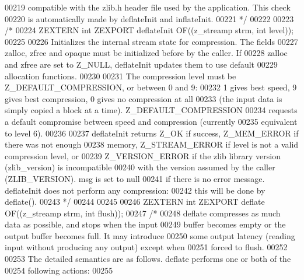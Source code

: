 \begin{DoxyCode}
00219 \textcolor{comment}{   compatible with the zlib.h header file used by the application.  This check}
00220 \textcolor{comment}{   is automatically made by deflateInit and inflateInit.}
00221 \textcolor{comment}{ */}
00222 
00223 \textcolor{comment}{/*}
00224 \textcolor{comment}{ZEXTERN int ZEXPORT deflateInit OF((z\_streamp strm, int level));}
00225 \textcolor{comment}{}
00226 \textcolor{comment}{     Initializes the internal stream state for compression.  The fields}
00227 \textcolor{comment}{   zalloc, zfree and opaque must be initialized before by the caller.  If}
00228 \textcolor{comment}{   zalloc and zfree are set to Z\_NULL, deflateInit updates them to use default}
00229 \textcolor{comment}{   allocation functions.}
00230 \textcolor{comment}{}
00231 \textcolor{comment}{     The compression level must be Z\_DEFAULT\_COMPRESSION, or between 0 and 9:}
00232 \textcolor{comment}{   1 gives best speed, 9 gives best compression, 0 gives no compression at all}
00233 \textcolor{comment}{   (the input data is simply copied a block at a time).  Z\_DEFAULT\_COMPRESSION}
00234 \textcolor{comment}{   requests a default compromise between speed and compression (currently}
00235 \textcolor{comment}{   equivalent to level 6).}
00236 \textcolor{comment}{}
00237 \textcolor{comment}{     deflateInit returns Z\_OK if success, Z\_MEM\_ERROR if there was not enough}
00238 \textcolor{comment}{   memory, Z\_STREAM\_ERROR if level is not a valid compression level, or}
00239 \textcolor{comment}{   Z\_VERSION\_ERROR if the zlib library version (zlib\_version) is incompatible}
00240 \textcolor{comment}{   with the version assumed by the caller (ZLIB\_VERSION).  msg is set to null}
00241 \textcolor{comment}{   if there is no error message.  deflateInit does not perform any compression:}
00242 \textcolor{comment}{   this will be done by deflate().}
00243 \textcolor{comment}{*/}
00244 
00245 
00246 ZEXTERN \textcolor{keywordtype}{int} ZEXPORT deflate OF((z\_streamp strm, \textcolor{keywordtype}{int} flush));
00247 \textcolor{comment}{/*}
00248 \textcolor{comment}{    deflate compresses as much data as possible, and stops when the input}
00249 \textcolor{comment}{  buffer becomes empty or the output buffer becomes full.  It may introduce}
00250 \textcolor{comment}{  some output latency (reading input without producing any output) except when}
00251 \textcolor{comment}{  forced to flush.}
00252 \textcolor{comment}{}
00253 \textcolor{comment}{    The detailed semantics are as follows.  deflate performs one or both of the}
00254 \textcolor{comment}{  following actions:}
00255 \textcolor{comment}{}

\end{DoxyCode}
